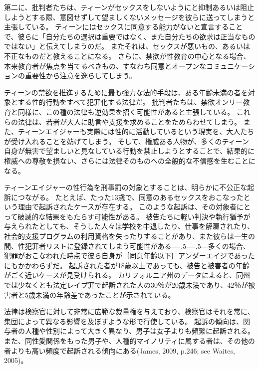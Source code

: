 \documentclass[paper=a4,book,openany]{jlreq}
\def\DDASH{―\kern-.5\zw―\kern-.5\zw―} %
\begin{document}
第二に、批判者たちは、ティーンがセックスをしないようにと抑制あるいは阻止しようとする際、意図せずして望ましくないメッセージを彼らに送ってしまうと主張している。
ティーンにはセックスに同意する能力がないと宣言することで、彼らに「自分たちの選択は重要ではなく、また自分たちの欲求は正当なものではない」と伝えてしまうのだ。
またそれは、セックスが悪いもの、あるいは不正なものだと教えることになる。
さらに、禁欲が性教育の中心となる場合、本来教育者が焦点を当てるべきもの、すなわち同意とオープンなコミュニケーションの重要性から注意を逸らしてしまう。

ティーンの禁欲を推進するために最も強力な法的手段は、ある年齢未満の者を対象とする性的行動をすべて犯罪化する法律だ。
批判者たちは、禁欲オンリー教育と同様に、この種の法律も逆効果を招く可能性があると主張している。
これらの法律は、若者が大人に助言や支援を求めることをためらわせてしまう。
また、ティーンエイジャーも実際には性的に活動しているという現実を、大人たちが受け入れることを妨げてしまう。
そして、権威ある人物が、多くのティーン自身が無害で望ましいと見なしている行動を禁止しようとすることで、結果的に権威への尊敬を損ない、さらには法律そのものへの全般的な不信感を生むことになる。

ティーンエイジャーの性行為を刑事罰の対象とすることは、明らかに不公正な起訴につながる。
たとえば、たった13歳で、同意のあるセックスをおこなったという理由で起訴されたケースが存在する。
このような起訴は、その対象者にとって破滅的な結果をもたらす可能性がある。
被告たちに軽い判決や執行猶予が与えられたとしても、そうした人々は学校を中退したり、仕事を解雇されたり、社会的支援プログラムの利用資格を失ったりすることがあり、また彼らは一生の間、性犯罪者リストに登録されてしまう可能性がある{\DDASH}多くの場合、犯罪がおこなわれた時点で彼ら自身が｛同意年齢以下｝{アンダーエイジ}であったにもかかわらずだ。
起訴された者が18歳以上であっても、被告と被害者の年齢がごく近いケースが見受けられる。
カリフォルニア州のデータによると、同州では少なくとも法定レイプ罪で起訴された人の30％が20歳未満であり、42％が被害者と5歳未満の年齢差であったことが示されている\citep[pp.51--52]{ccasa2008}。

法律は検察官に対して非常に広範な裁量権を与えており、検察官はそれを常に、集団によって異なる影響を及ぼすような形で行使している。
起訴の傾向は、関与者の人種や性別によって大きく異なり、男子は女子よりも頻繁に起訴される。
また、同性愛関係をもった男子や、人種的マイノリティに属する者は、その他の者よりも高い頻度で起訴される傾向にある(James, 2009, p.246; see Waites, 2005)。
\nocite{james09:_romeo_juliet_were_sex_offen}\nocite{waites04:_age_consen_sexual_consen}
\end{document}
